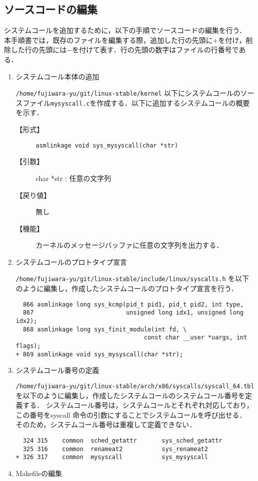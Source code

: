 \documentclass[12pt]{jsarticle}
\begin{document}
\subsection{ソースコードの編集}
システムコールを追加するために，以下の手順でソースコードの編集を行う．
本手順書では，既存のファイルを編集する際，追加した行の先頭に$+$を付け，削除した行の先頭には$-$を付けて表す．行の先頭の数字はファイルの行番号である．
\begin{enumerate}

\item システムコール本体の追加

\verb|/home/fujiwara-yu/git/linux-stable/kernel| 以下にシステムコールのソースファイル\verb|mysyscall.c|を作成する．以下に追加するシステムコールの概要を示す．
\begin{description}
\item[【形式】]\verb|asmlinkage void sys_mysyscall(char *str)|

\item[【引数】]char *str : 任意の文字列

\item [【戻り値】]無し

\item [【機能】]カーネルのメッセージバッファに任意の文字列を出力する．

\end{description}

\item システムコールのプロトタイプ宣言

\verb|/home/fujiwara-yu/git/linux-stable/include/linux/syscalls.h| を以下のように編集し，作成したシステムコールのプロトタイプ宣言を行う．
\begin{spacing}{0.7}
\begin{verbatim}
  866 asmlinkage long sys_kcmp(pid_t pid1, pid_t pid2, int type,
  867                          unsigned long idx1, unsigned long idx2);
  868 asmlinkage long sys_finit_module(int fd, \ 
                                    const char __user *uargs, int flags);
+ 869 asmlinkage void sys_mysyscall(char *str);
\end{verbatim}
\end{spacing}
\item システムコール番号の定義

\verb|/home/fujiwara-yu/git/linux-stable/arch/x86/syscalls/syscall_64.tbl| を以下のように編集し，作成したシステムコールのシステムコール番号を定義する．
システムコール番号は，システムコールとそれぞれ対応しており，この番号をsyscall 命令の引数にすることでシステムコールを呼び出せる．
そのため，システムコール番号は重複して定義できない．
\begin{spacing}{0.7}
\begin{verbatim}
  324 315    common  sched_getattr       sys_sched_getattr
  325 316    common  renameat2           sys_renameat2
+ 326 317    common  mysyscall           sys_mysyscall
\end{verbatim}
\end{spacing}
\item Makefileの編集


\end{enumerate}
\end{document}
